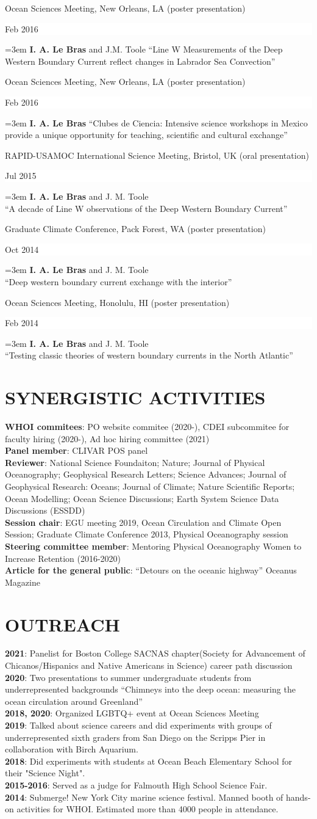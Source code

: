 \documentclass[paper=letter,fontsize=11pt]{scrartcl} %
\newcommand{\sepspace}{\vspace*{3mm}}		%
\newcommand{\NewPart}[2]{\section*{\uppercase{#1} #2}}
\newcommand{\ShortEntry}[2]{\normalsize \noindent \textbf{#1}: #2 \\ }
\newcommand{\ConfEntry}[5]{
		\noindent #1 (#2) \hfill      %
		\colorbox{White}{%
			\parbox{6em}{%
			\hfill\color{Black}#3}} \par %
		\noindent \hangindent=3em\hangafter=0 #4 ``#5'' \sepspace}
\begin{document}
\ConfEntry{Ocean Sciences Meeting, New Orleans, LA}{poster presentation}{Feb 2016}{\textbf{I. A. Le Bras} and J.M. Toole}{Line W Measurements of the Deep Western Boundary Current reflect changes in Labrador Sea Convection}

\ConfEntry{Ocean Sciences Meeting, New Orleans, LA}{poster presentation}{Feb 2016}{\textbf{I. A. Le Bras}}{Clubes de Ciencia: Intensive science workshops in Mexico provide a unique opportunity for teaching, scientific and cultural exchange}

\ConfEntry{RAPID-USAMOC International Science Meeting, Bristol, UK}{oral presentation}{Jul 2015}{\textbf{I. A. Le Bras} and J. M. Toole\\}{A decade of Line W observations of the Deep Western Boundary Current}

\ConfEntry{Graduate Climate Conference, Pack Forest, WA}{poster presentation}{Oct 2014}{\textbf{I. A. Le Bras} and J. M. Toole\\}{Deep western boundary current exchange with the interior}

\ConfEntry{Ocean Sciences Meeting, Honolulu, HI}{poster presentation}{Feb 2014}{\textbf{I. A. Le Bras} and J. M. Toole\\}{Testing classic theories of western boundary currents in the North Atlantic}

\NewPart{Synergistic Activities}{}
\ShortEntry{WHOI commitees}{PO website commitee (2020-), CDEI subcommitee for faculty hiring (2020-), Ad hoc hiring committee (2021)}
\ShortEntry{Panel member}{CLIVAR POS panel}
\ShortEntry{Reviewer}{National Science Foundaiton; Nature; Journal of Physical Oceanography; Geophysical Research Letters; Science Advances; Journal of Geophysical Research: Oceans; Journal of Climate; Nature Scientific Reports; Ocean Modelling; Ocean Science Discussions; Earth System Science Data Discussions (ESSDD)}
\ShortEntry{Session chair}{EGU meeting 2019, Ocean Circulation and Climate Open Session; Graduate Climate Conference 2013, Physical Oceanography session}
\ShortEntry{Steering committee member}{Mentoring Physical Oceanography Women to Increase Retention (2016-2020)}
\ShortEntry{Article for the general public}{ ``Detours on the oceanic highway'' Oceanus Magazine}


\NewPart{Outreach}{}
\ShortEntry{2021}{Panelist for Boston College SACNAS chapter(Society for Advancement of Chicanos/Hispanics and Native Americans in Science) career path discussion}
\ShortEntry{2020}{Two presentations to summer undergraduate students from underrepresented backgrounds ``Chimneys into the deep ocean: measuring the ocean circulation around Greenland''}
\ShortEntry{2018, 2020}{Organized LGBTQ+ event at Ocean Sciences Meeting}
\ShortEntry{2019}{Talked about science careers and did experiments with groups of underrepresented sixth graders from San Diego on the Scripps Pier in collaboration with Birch Aquarium.}
\ShortEntry{2018}{Did experiments with students at Ocean Beach Elementary School for their "Science Night".}
\ShortEntry{2015-2016}{Served as a judge for Falmouth High School Science Fair.}
\ShortEntry{2014}{Submerge! New York City marine science festival. Manned booth of hands-on activities for WHOI. Estimated more than 4000 people in attendance.}
\end{document}
